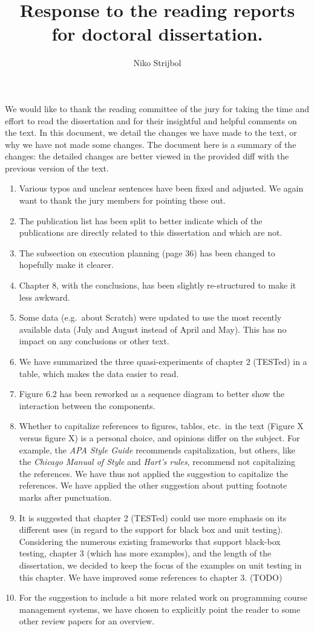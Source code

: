 \documentclass[
    paper=a4,
    paper=portrait,
    parskip=half,
]{scrartcl}
\author{Niko Strijbol}
\title{Response to the reading reports for doctoral dissertation.}
\begin{document}
\maketitle

We would like to thank the reading committee of the jury for taking the time and effort to read the dissertation and for their insightful and helpful comments on the text.
In this document, we detail the changes we have made to the text, or why we have not made some changes.
The document here is a summary of the changes: the detailed changes are better viewed in the provided diff with the previous version of the text.

\begin{enumerate}
    \item Various typos and unclear sentences have been fixed and adjusted.
        We again want to thank the jury members for pointing these out.
    \item The publication list has been split to better indicate which of the publications are directly related to this dissertation and which are not.
    \item The subsection on execution planning (page 36) has been changed to hopefully make it clearer.
    \item Chapter 8, with the conclusions, has been slightly re-structured to make it less awkward.
    \item Some data (e.g.\ about Scratch) were updated to use the most recently available data (July and August instead of April and May).
        This has no impact on any conclusions or other text.
    \item We have summarized the three quasi-experiments of chapter 2 (TESTed) in a table, which makes the data easier to read.
    \item Figure 6.2 has been reworked as a sequence diagram to better show the interaction between the components.
    \item Whether to capitalize references to figures, tables, etc.\ in the text (Figure X versus figure X) is a personal choice, and opinions differ on the subject.
    For example, the \textit{APA Style Guide} recommends capitalization, but others, like the \textit{Chicago Manual of Style} and \textit{Hart's rules}, recommend not capitalizing the references.
    We have thus not applied the suggestion to capitalize the references.
    We have applied the other suggestion about putting footnote marks after punctuation.
    \item It is suggested that chapter 2 (TESTed) could use more emphasis on its different uses (in regard to the support for black box and unit testing).
    Considering the numerous existing frameworks that support black-box testing, chapter 3 (which has more examples), and the length of the dissertation, we decided to keep the focus of the examples on unit testing in this chapter.
    We have improved some references to chapter 3. (TODO)
    \item For the suggestion to include a bit more related work on programming course management systems, we have chosen to explicitly point the reader to some other review papers for an overview.
\end{enumerate}
\end{document}
